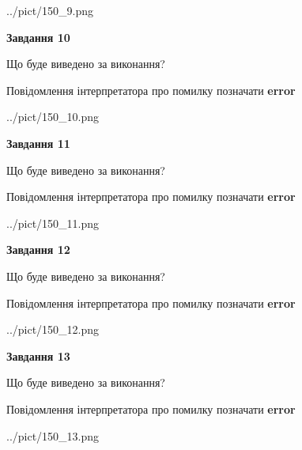 \documentclass[11pt, ukrainian]{article}
\begin{document}
{\begin {large}
\begin{center}
	{../pict/150_9.png}
\end{center}
\newpage

{\begin {center}\textbf{Завдання 10}\end {center}}\par
Що буде виведено за виконання? \par
Повідомлення інтерпретатора про помилку позначати \textbf{error}

\begin{center}
	{../pict/150_10.png}
\end{center}
\newpage

{\begin {center}\textbf{Завдання 11}\end {center}}\par
Що буде виведено за виконання? \par
Повідомлення інтерпретатора про помилку позначати \textbf{error}

\begin{center}
	{../pict/150_11.png}
\end{center}
\newpage

{\begin {center}\textbf{Завдання 12}\end {center}}\par
Що буде виведено за виконання? \par
Повідомлення інтерпретатора про помилку позначати \textbf{error}

\begin{center}
	{../pict/150_12.png}
\end{center}
\newpage

{\begin {center}\textbf{Завдання 13}\end {center}}\par
Що буде виведено за виконання? \par
Повідомлення інтерпретатора про помилку позначати \textbf{error}

\begin{center}
	{../pict/150_13.png}
\end{center}
\newpage


\end{large}}
\end{document}
